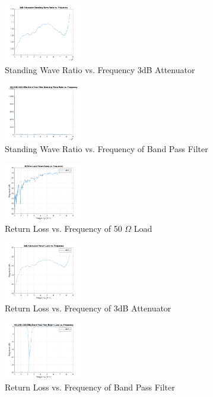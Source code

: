 \documentclass[journal]{IEEEtran}
\begin{document}
\begin{figure}[hbp]
    \centering
    \includegraphics[width=0.3\textwidth]{3db_swr.png}
    \caption{\label{fig:3db_swr}  Standing Wave Ratio vs. Frequency  3dB Attenuator}
\end{figure}

\begin{figure}[hbp]
    \centering
    \includegraphics[width=0.3\textwidth]{band_pass_swr.png}
    \caption{\label{fig:band_pass_swr}  Standing Wave Ratio vs. Frequency  of Band Pass Filter}
\end{figure}

\begin{figure}[hbp]
    \centering
    \includegraphics[width=0.3\textwidth]{load_rl.png}
    \caption{\label{fig:load_rl}  Return Loss vs. Frequency  of 50 \(\Omega\) Load}
\end{figure}

\begin{figure}[hbp]
    \centering
    \includegraphics[width=0.3\textwidth]{3db_rl.png}
    \caption{\label{fig:3db_rl}  Return Loss vs. Frequency  of 3dB Attenuator}
\end{figure}

\begin{figure}[hbp]
    \centering
    \includegraphics[width=0.3\textwidth]{band_pass_rl.png}
    \caption{\label{fig:band_pass_rl}  Return Loss vs. Frequency  of Band Pass Filter}
\end{figure}
\end{document}
